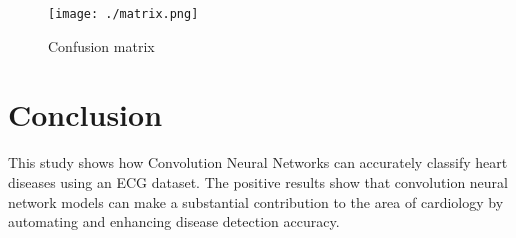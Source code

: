 \documentclass[conference]{article}
\begin{document}
\begin{figure}[H]
    \centering
    \begin{minipage}{0.6\textwidth}
        \centering
        \texttt{[image: ./matrix.png]}
        \caption{Confusion matrix}
        \label{fig: Confusion matrix}
    \end{minipage}\hfill
\end{figure}

\section{Conclusion}

This study shows how Convolution Neural Networks can accurately classify heart diseases using an ECG dataset. The positive results show that convolution neural network models can make a substantial contribution to the area of cardiology by automating and enhancing disease detection accuracy.
\end{document}
